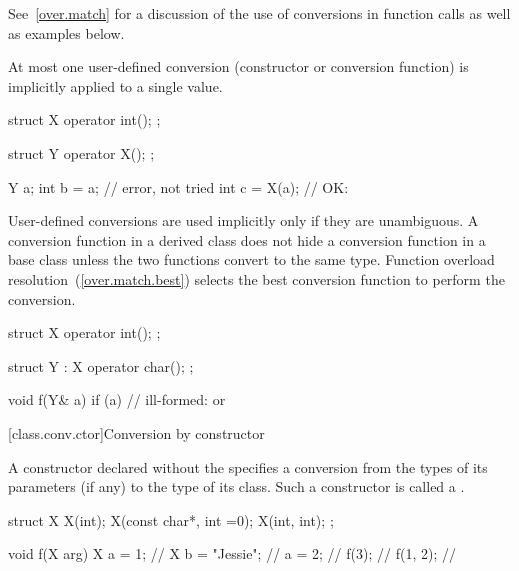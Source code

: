 \pnum
\begin{note}
See~\ref{over.match} for a discussion of the use of conversions in function calls
as well as examples below.
\end{note}

\pnum
{}%
At most one user-defined conversion (constructor or conversion function)
is implicitly applied to a single value.
\begin{example}
\begin{codeblock}
struct X {
  operator int();
};

struct Y {
  operator X();
};

Y a;
int b = a;          // error,  not tried
int c = X(a);       // OK: 
\end{codeblock}
\end{example}

\pnum
User-defined conversions are used implicitly only if they are unambiguous.
%
A conversion function in a derived class does not hide a conversion function
in a base class unless the two functions convert to the same type.
Function overload resolution~(\ref{over.match.best}) selects the best
conversion function to perform the conversion.
\begin{example}
\begin{codeblock}
struct X {
  operator int();
};

struct Y : X {
    operator char();
};

void f(Y& a) {
  if (a) {          // ill-formed:  or 
  }
}
\end{codeblock}
\end{example}

[class.conv.ctor]{Conversion by constructor}%
%

\pnum
A constructor declared without the
specifies a conversion from
the types of its parameters (if any)
to the type of its class.
Such a constructor is called a
%
.
\begin{example}

%
\begin{codeblock}
struct X {
    X(int);
    X(const char*, int =0);
    X(int, int);
};

void f(X arg) {
  X a = 1;          // 
  X b = "Jessie";   // 
  a = 2;            // 
  f(3);             // 
  f({1, 2});        // 
}
\end{codeblock}
\end{example}

